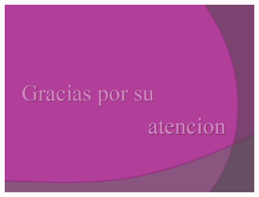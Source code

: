 \documentclass{beamer}
\begin{document}
\begin{frame}
\frametitle{ }
\begin{figure}[!th]
\begin{center}
\includegraphics[width=1\textwidth]{img/picn17.eps}
\end{center}
\end{figure}
\end{frame}


\end{document}
